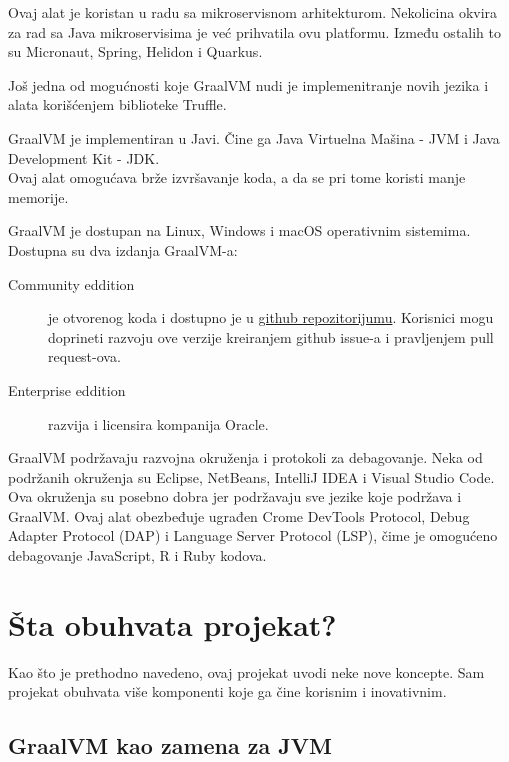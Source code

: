 \documentclass[a4paper]{article}
\begin{document}
Ovaj alat je koristan u radu sa mikroservisnom arhitekturom. Nekolicina okvira za rad sa Java mikroservisima je već prihvatila ovu platformu. Između ostalih to su Micronaut, Spring, Helidon i Quarkus. 

Još jedna od mogućnosti koje GraalVM nudi je implemenitranje novih jezika i alata korišćenjem biblioteke Truffle.

GraalVM je implementiran u Javi. Čine ga Java Virtuelna Mašina - JVM i Java Development Kit - JDK. \\
Ovaj alat omogućava brže izvršavanje koda, a da se pri tome koristi manje memorije.

GraalVM je dostupan na Linux, Windows i macOS operativnim sistemima. \\

Dostupna su dva izdanja GraalVM-a:

\begin{description}
	\item [Community eddition] je otvorenog koda i dostupno je u \href{https://github.com/oracle/graal}{github repozitorijumu}. Korisnici mogu doprineti razvoju ove verzije kreiranjem github issue-a i pravljenjem pull request-ova. \cite{graalvmCommunity}
	\item [Enterprise eddition] razvija i licensira kompanija Oracle. \cite{graalvmEnterprise}
\end{description}

GraalVM podržavaju razvojna okruženja i protokoli za debagovanje. Neka od podržanih okruženja su Eclipse, NetBeans, IntelliJ IDEA i Visual Studio Code. Ova okruženja su posebno dobra jer podržavaju sve jezike koje podržava i GraalVM. Ovaj alat obezbeđuje ugrađen Crome DevTools Protocol, Debug Adapter Protocol (DAP) i Language Server Protocol (LSP), čime je omogućeno debagovanje JavaScript, R i Ruby kodova.

\section{Šta obuhvata projekat?}
\label{sec:Šta obuhvata projekat?}
Kao što je prethodno navedeno, ovaj projekat uvodi neke nove koncepte.
Sam projekat obuhvata više komponenti koje ga čine korisnim i inovativnim.

\subsection{GraalVM kao zamena za JVM}
\label{sub:GraalVM kao zamena za JVM}
\end{document}
